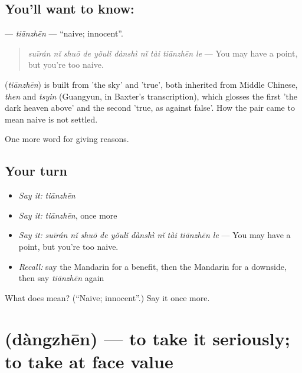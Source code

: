 \subsection*{You'll want to know: }
\textbf{} — \emph{tiānzhēn} — \textquotedblleft{}naive; innocent\textquotedblright{}.

\begin{quote}
\textbf{} \emph{suīrán nǐ shuō de yǒulǐ dànshì nǐ tài tiānzhēn le} — You may have a point, but you're too naive.
\end{quote}

\begin{cousinweb}
\textbf{} (\emph{tiānzhēn}) is built from  'the sky' and  'true', both inherited from Middle Chinese, \emph{then} and \emph{tsyin} (Guangyun, in Baxter's transcription), which glosses the first 'the dark heaven above' and the second 'true, as against false'. How the pair came to mean naive is not settled.
\end{cousinweb}

\begin{grammarlens}[title={What you've built}]
One more word for giving reasons.
\end{grammarlens}

\subsection*{Your turn}
\begin{itemize}
\raggedright
  \item \emph{Say it:} \emph{tiānzhēn}
  \item \emph{Say it:} \emph{tiānzhēn}, once more
  \item \emph{Say it:} \emph{suīrán nǐ shuō de yǒulǐ dànshì nǐ tài tiānzhēn le} — You may have a point, but you're too naive.
  \item \emph{Recall:} say the Mandarin for a benefit, then the Mandarin for a downside, then say \emph{tiānzhēn} again
\end{itemize}

\begin{tcolorbox}[breakable,colback=teal!4,colframe=teal!35!black,title={Before you move on}]
What does  mean? (\textquotedblleft{}Naive; innocent\textquotedblright{}.) Say it once more.
\end{tcolorbox}
\section[\texorpdfstring{\zh{当真} (dàngzhēn)}{当真 (dàngzhēn)}]{ (dàngzhēn) — to take it seriously; to take at face value}

